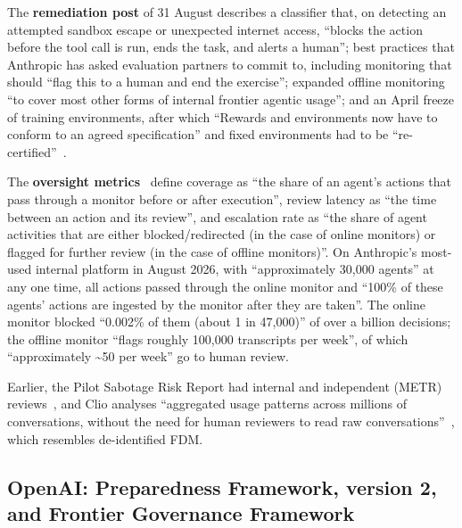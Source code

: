 \documentclass[11pt]{article}
\begin{document}
The \textbf{remediation post} of 31 August describes a classifier that, on detecting an attempted sandbox escape or unexpected internet access, ``blocks the action before the tool call is run, ends the task, and alerts a human''; best practices that Anthropic has asked evaluation partners to commit to, including monitoring that should ``flag this to a human and end the exercise''; expanded offline monitoring ``to cover most other forms of internal frontier agentic usage''; and an April freeze of training environments, after which ``Rewards and environments now have to conform to an agreed specification'' and fixed environments had to be ``re-certified''~\cite{anthropic2026improving}.

The \textbf{oversight metrics}~\cite{favaro2026} define coverage as ``the share of an agent's actions that pass through a monitor before or after execution'', review latency as ``the time between an action and its review'', and escalation rate as ``the share of agent activities that are either blocked/redirected (in the case of online monitors) or flagged for further review (in the case of offline monitors)''. On Anthropic's most-used internal platform in August 2026, with ``approximately 30,000 agents'' at any one time, all actions passed through the online monitor and ``100\% of these agents' actions are ingested by the monitor after they are taken''. The online monitor blocked ``0.002\% of them (about 1 in 47,000)'' of over a billion decisions; the offline monitor ``flags roughly 100,000 transcripts per week'', of which ``approximately \textasciitilde50 per week'' go to human review.

Earlier, the Pilot Sabotage Risk Report had internal and independent (METR) reviews~\cite{bowman2025}, and Clio analyses ``aggregated usage patterns across millions of conversations, without the need for human reviewers to read raw conversations''~\cite{tamkin2024}, which resembles de-identified FDM.

\subsection{OpenAI: Preparedness Framework, version 2, and Frontier Governance Framework}\label{sec:openai}
\end{document}
